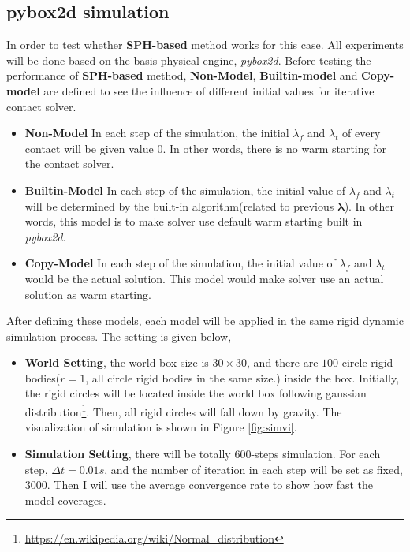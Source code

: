 \subsection{pybox2d simulation}
    \label{sph:exp}
    In order to test whether \textbf{SPH-based} method works for this case. All experiments will be done based on the basis physical engine, \textit{pybox2d}. Before testing the performance of \textbf{SPH-based} method, \textbf{Non-Model}, \textbf{Builtin-model} and \textbf{Copy-model} are defined to see the influence of different initial values for iterative contact solver.
    \begin{itemize}
        \item \textbf{Non-Model} In each step of the simulation, the initial $\lambda_{f}$ and $\lambda_{t}$ of every contact will be given value $0$. In other words, there is no warm starting for the contact solver.
        \item \textbf{Builtin-Model} In each step of the simulation, the initial value of $\lambda_f$ and $\lambda_{t}$ will be determined by the built-in algorithm(related to previous $\pmb{\lambda}$). In other words, this model is to make solver use default warm starting built in \textit{pybox2d}.
        \item \textbf{Copy-Model} In each step of the simulation, the initial value of $\lambda_f$ and $\lambda_t$ would be the actual solution. This model would make solver use an actual solution as warm starting.
    \end{itemize}
    After defining these models, each model will be applied in the same rigid dynamic simulation process. The setting is given below,
    \begin{itemize}
        \item \textbf{World Setting}, the world box size is $30\times30$,   and there are $100$ circle rigid bodies($r=1$, all circle rigid bodies in the same size.) inside the box. Initially, the rigid circles will be located inside the world box following gaussian distribution\footnote{\url{https://en.wikipedia.org/wiki/Normal_distribution}}. Then, all rigid circles will fall down by gravity. The visualization of simulation is shown in Figure \ref{fig:simvi}.
        \item \textbf{Simulation Setting}, there will be totally $600$-steps simulation. For each step, $\Delta t = 0.01s$, and the number of iteration in each step will be set as fixed, $3000$. Then I will use the average convergence rate to show how fast the model coverages.
    \end{itemize}
